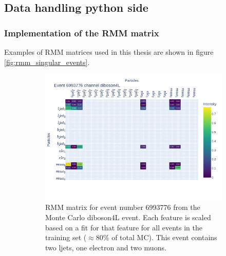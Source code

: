\subsection*{Data handling python side}



\subsubsection*{Implementation of the RMM matrix}
Examples of RMM matrices used in this thesis are shown in figure \ref{fig:rmm_singular_events}. 


\begin{figure}[h!]
    \centering
    \begin{subfigure}{.8\textwidth}
        \includegraphics[width=\textwidth]{Figures/rmms/rmm_event_6993776_diboson4L.pdf}
        \caption{RMM matrix for event number 6993776 from the Monte Carlo diboson4L event. Each feature is scaled based on a fit for that feature for 
        all events in the training set ($\approx 80\%$ of total MC). This event contains two ljets, one electron and two muons.}
        \label{fig:rmm_dib4l_event}
    \end{subfigure}
    \hfill
    \begin{subfigure}{.8\textwidth}

\end{subfigure}
\end{figure}
